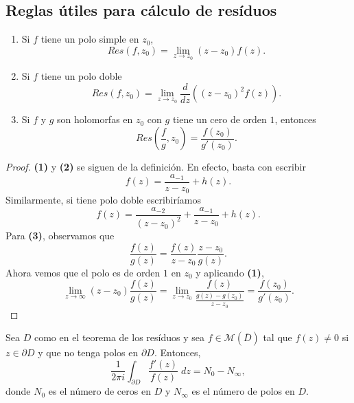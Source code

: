 \subsection*{Reglas útiles para cálculo de resíduos}
\begin{prop}
\begin{enumerate}
\item Si $\displaystyle f $ tiene un polo simple en $\displaystyle z_{0} $, 
	\[Res\left(f, z_{0}\right)=\lim_{z \to z_{0}}\left(z-z_{0}\right)f\left(z\right) .\]
\item Si $\displaystyle f $ tiene un polo doble
	\[Res\left(f, z_{0}\right)=\lim_{z \to z_{0}}\frac{d}{dz}\left(\left(z-z_{0}\right)^{2}f\left(z\right)\right) .\]
\item Si $\displaystyle f $ y $\displaystyle g $ son holomorfas en $\displaystyle z_{0} $ con $\displaystyle g $ tiene un cero de orden $\displaystyle 1 $, entonces
	\[Res\left(\frac{f}{g}, z_{0}\right)=\frac{f\left(z_{0}\right)}{g'\left(z_{0}\right)} .\]
\end{enumerate}
\end{prop}
\begin{proof}
\textbf{(1)} y \textbf{(2)} se siguen de la definición. En efecto, basta con escribir
\[f\left(z\right)=\frac{a_{-1}}{z-z_{0}}+h\left(z\right) .\]
Similarmente, si tiene polo doble escribiríamos 
\[f\left(z\right)=\frac{a_{-2}}{\left(z-z_{0}\right)^{2}}+\frac{a_{-1}}{z-z_{0}}+h\left(z\right) .\]
Para \textbf{(3)}, observamos que 
\[\frac{f\left(z\right)}{g\left(z\right)}=\frac{f\left(z\right)}{z-z_{0}}\frac{z-z_{0}}{g\left(z\right)} .\]
Ahora vemos que el polo es de orden $\displaystyle 1 $ en $\displaystyle z_{0} $ y aplicando \textbf{(1)}, 
\[\lim_{z \to \infty}\left(z-z_{0}\right)\frac{f\left(z\right)}{g\left(z\right)}=\lim_{z \to z_{0}}\frac{f\left(z\right)}{\frac{g\left(z\right)-g\left(z_{0}\right)}{z-z_{0}}}=\frac{f\left(z_{0}\right)}{g'\left(z_{0}\right)} .\]
\end{proof}
\begin{theorem}
Sea $\displaystyle D $ como en el teorema de los resíduos y sea $\displaystyle f \in \mathcal{M}\left(\overline{D}\right) $ tal que $\displaystyle f\left(z\right)\neq 0 $ si $\displaystyle z \in \partial D $ y que no tenga polos en $\displaystyle \partial D $. Entonces, 
\[\frac{1}{2\pi i}\int _{\partial D}\frac{f'\left(z\right)}{f\left(z\right)} \; dz = N_{0}-N_{\infty} ,\]
donde $\displaystyle N_{0} $ es el número de ceros en $\displaystyle D $ y $\displaystyle N_{\infty} $ es el número de polos en $\displaystyle D $. 
\end{theorem}
